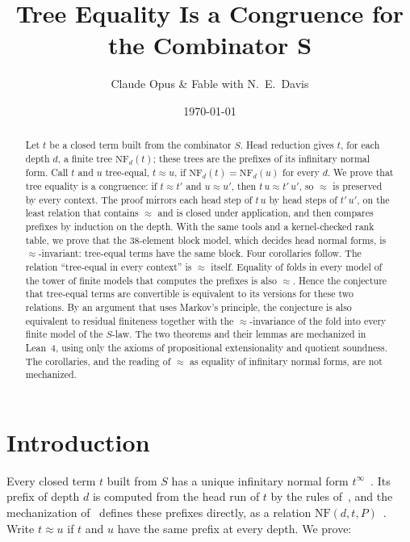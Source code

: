 \documentclass[11pt]{amsart}
\title[Tree Equality Is a Congruence]{Tree Equality Is a Congruence for the Combinator $\bm{S}$}
\author{Claude Opus \& Fable with N.\ E.\ Davis}
\date{\today}
\theoremstyle{definition}
\newcommand{\NF}{\mathrm{NF}}
\begin{document}
\begin{abstract}
Let $t$ be a closed term built from the combinator $S$. Head reduction gives $t$, for each depth $d$,
a finite tree $\NF_d(t)$; these trees are the prefixes of its infinitary normal form. Call $t$ and
$u$ tree-equal, $t\approx u$, if $\NF_d(t)=\NF_d(u)$ for every $d$. We prove that tree equality is a
congruence: if $t\approx t'$ and $u\approx u'$, then $t\,u\approx t'\,u'$, so $\approx$ is preserved by
every context. The proof mirrors each head step of $t\,u$ by head steps of $t'\,u'$, on the least
relation that contains $\approx$ and is closed under application, and then compares prefixes by
induction on the depth. With the same tools and a kernel-checked rank table, we prove that the
38-element block model, which decides head normal forms, is $\approx$-invariant: tree-equal terms have
the same block. Four corollaries follow. The relation ``tree-equal in every context'' is $\approx$
itself. Equality of folds in every model of the tower of finite models that computes the prefixes
is also $\approx$. Hence the conjecture that tree-equal terms are convertible is equivalent to its
versions for these two relations. By an argument that uses Markov's principle, the conjecture is
also equivalent to residual finiteness together with the $\approx$-invariance of the fold into every
finite model of the $S$-law. The two theorems and their lemmas are mechanized in Lean~4, using only
the axioms of propositional extensionality and quotient soundness. The corollaries, and the reading
of $\approx$ as equality of infinitary normal forms, are not mechanized.
\end{abstract}

\maketitle

\section{Introduction}

Every closed term $t$ built from $S$ has a unique infinitary normal form
$t^\infty$~\citep{s3}. Its prefix of depth $d$ is computed from the head run of $t$ by the rules
of~\citep[Proposition~9]{s3}, and the mechanization of~\citep{s3} defines these prefixes directly,
as a relation $\NF(d,t,P)$~\citep[Remark~8]{s3}. Write $t\approx u$ if $t$ and $u$ have the same prefix at
every depth. We prove:
\end{document}
